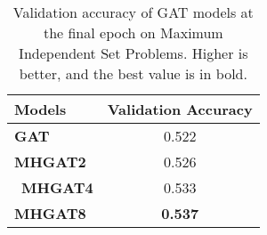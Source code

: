 \begin{table}[htb!]
    \centering
    \begin{tabular}{|l c|}
        \hline
        \textbf{Models} & \textbf{Validation Accuracy}\\
        \hline
        \textbf{GAT} & 0.522\\
        \textbf{MHGAT2} & 0.526\\\
        \textbf{MHGAT4} & 0.533\\
        \textbf{MHGAT8} & \textbf{0.537}\\
        \hline
    \end{tabular}
    \caption{Validation accuracy of GAT models at the final epoch on Maximum Independent Set Problems.
    Higher is better, and the best value is in bold.}
    \label{tab:is-validation-accuracy}
\end{table}